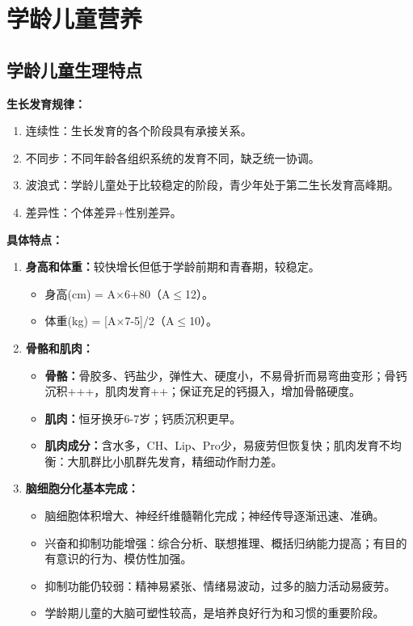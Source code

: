 \section{学龄儿童营养}

\subsection{学龄儿童生理特点}

\begin{keybox}
\textbf{生长发育规律：}
\begin{enumerate}[leftmargin=*]
    \item 连续性：生长发育的各个阶段具有承接关系。
    \item 不同步：不同年龄各组织系统的发育不同，缺乏统一协调。
    \item 波浪式：学龄儿童处于比较稳定的阶段，青少年处于第二生长发育高峰期。
    \item 差异性：个体差异+性别差异。
\end{enumerate}

\textbf{具体特点：}
\begin{enumerate}[leftmargin=*]
    \item \textbf{身高和体重：}较快增长但低于学龄前期和青春期，较稳定。
    \begin{itemize}[leftmargin=*]
        \item 身高(cm) = A$\times$6+80（A$\leq$12）。
        \item 体重(kg) = [A$\times$7-5]/2（A$\leq$10）。
    \end{itemize}

    \item \textbf{骨骼和肌肉：}
    \begin{itemize}
        \item \textbf{骨骼：}骨胶多、钙盐少，弹性大、硬度小，不易骨折而易弯曲变形；骨钙沉积+++，肌肉发育++；保证充足的钙摄入，增加骨骼硬度。
        \item \textbf{肌肉：}恒牙换牙6-7岁；钙质沉积更早。
        \item \textbf{肌肉成分：}含水多，CH、Lip、Pro少，易疲劳但恢复快；肌肉发育不均衡：大肌群比小肌群先发育，精细动作耐力差。
    \end{itemize}

    \item \textbf{脑细胞分化基本完成：}
    \begin{itemize}
        \item 脑细胞体积增大、神经纤维髓鞘化完成；神经传导逐渐迅速、准确。
        \item 兴奋和抑制功能增强：综合分析、联想推理、概括归纳能力提高；有目的有意识的行为、模仿性加强。
        \item 抑制功能仍较弱：精神易紧张、情绪易波动，过多的脑力活动易疲劳。
        \item 学龄期儿童的大脑可塑性较高，是培养良好行为和习惯的重要阶段。
    \end{itemize}


\end{enumerate}
\end{keybox}
